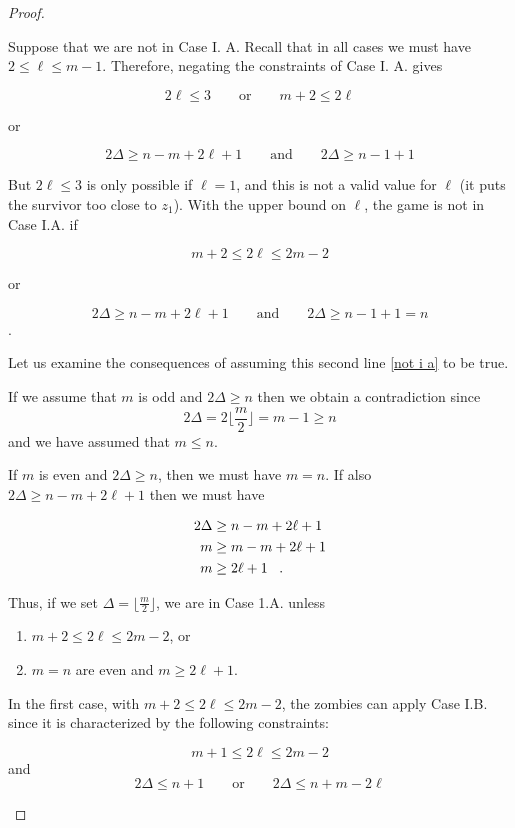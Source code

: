 \begin{proof}
\begin{proofpart}
Suppose that we are not in Case I. A. Recall that in all cases we must have $2 \leq \ell \leq m-1$. Therefore, negating the constraints of Case I. A. gives

\[2\ell \leq 3 \qquad \text{or} \qquad m+2 \leq 2 \ell \]
\begin{center}or\end{center}
\[ 2\Delta \geq n - m + 2\ell +1 \qquad \text{and} \qquad 2 \Delta \geq n - 1 + 1 \]

But $2\ell \leq 3$ is only possible if $\ell = 1$, and this is not a valid value for $\ell$ (it puts the survivor too close to $z_1$). With the upper bound on $\ell$, the game is not in Case I.A. if

\[m+2 \leq 2 \ell \leq 2m-2\]
\begin{center}or\end{center}
\[ 2\Delta \geq n - m + 2\ell +1 \qquad \text{and} \qquad 2 \Delta \geq n - 1 + 1 = n \tag{*} \label{not i a}\].

Let us examine the consequences of assuming this second line \ref{not i a} to be true.

If we assume that $m$ is odd and $2 \Delta \geq n$ then we obtain a contradiction since
\[ 2 \Delta = 2 \lfloor \frac{m}{2} \rfloor = m -1 \geq n \]
and we have assumed that $m \leq n$.

If $m$ is even and $2\Delta \geq n$, then we must have $m = n$. If also $2\Delta \geq n - m + 2\ell +1$ then we must have

\begin{align*}
  2 \Delta & \geq n - m + 2\ell + 1 \\
  m & \geq m - m + 2 \ell + 1 \\
  m & \geq 2 \ell + 1 \mperiod
\end{align*}

Thus, if we set $\Delta = \lfloor \frac{m}{2} \rfloor$, we are in Case 1.A. unless

\begin{enumerate}
  \item $m+2 \leq 2\ell \leq 2m-2$, or
  \item $m=n$ are even and $m \geq 2\ell +1$.
\end{enumerate}

In the first case, with $m+2 \leq 2\ell \leq 2m-2$, the zombies can apply Case I.B. since it is characterized by the following constraints:

\[ m+1 \leq 2 \ell \leq 2m -2 \]
and
\[2 \Delta \leq n +1 \qquad \text{or} \qquad 2\Delta \leq n + m - 2 \ell \]


\end{proofpart}
\end{proof}
